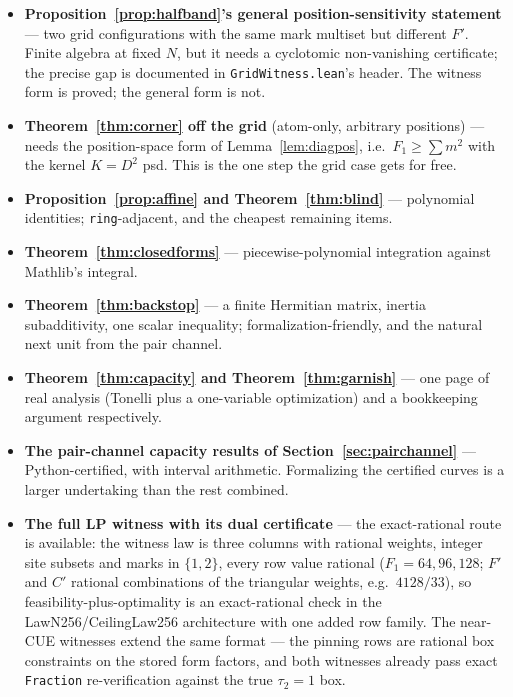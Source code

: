 \documentclass[11pt]{article}
\theoremstyle{plain}
\theoremstyle{definition}
\theoremstyle{remark}
\begin{document}
\begin{itemize}
\item \textbf{Proposition~\ref{prop:halfband}'s general position-sensitivity
  statement} --- two grid configurations with the same mark multiset but
  different $F'$. Finite algebra at fixed $N$, but it needs a cyclotomic
  non-vanishing certificate; the precise gap is documented in
  \texttt{GridWitness.lean}'s header. The witness form is proved; the general
  form is not.
\item \textbf{Theorem~\ref{thm:corner} off the grid} (atom-only, arbitrary
  positions) --- needs the position-space form of Lemma~\ref{lem:diagpos},
  i.e.\ $F_1 \ge \sum m^2$ with the kernel $K = D^2$ psd. This is the one step
  the grid case gets for free.
\item \textbf{Proposition~\ref{prop:affine} and Theorem~\ref{thm:blind}} ---
  polynomial identities; \texttt{ring}-adjacent, and the cheapest remaining
  items.
\item \textbf{Theorem~\ref{thm:closedforms}} --- piecewise-polynomial
  integration against Mathlib's integral.
\item \textbf{Theorem~\ref{thm:backstop}} --- a finite Hermitian matrix, inertia
  subadditivity, one scalar inequality; formalization-friendly, and the natural
  next unit from the pair channel.
\item \textbf{Theorem~\ref{thm:capacity} and Theorem~\ref{thm:garnish}} --- one
  page of real analysis (Tonelli plus a one-variable optimization) and a
  bookkeeping argument respectively.
\item \textbf{The pair-channel capacity results of
  Section~\ref{sec:pairchannel}} --- Python-certified, with interval arithmetic.
  Formalizing the certified curves is a larger undertaking than the rest
  combined.
\item \textbf{The full LP witness with its dual certificate} --- the
  exact-rational route is available: the witness law is three columns with
  rational weights, integer site subsets and marks in $\{1, 2\}$, every row value
  rational ($F_1 = 64, 96, 128$; $F'$ and $C'$ rational combinations of the
  triangular weights, e.g.\ $4128/33$), so feasibility-plus-optimality is an
  exact-rational check in the LawN256/CeilingLaw256 architecture with one added
  row family. The near-CUE witnesses extend the same format --- the pinning rows
  are rational box constraints on the stored form factors, and both witnesses
  already pass exact \texttt{Fraction} re-verification against the true
  $\tau_2 = 1$ box.
\end{itemize}
\end{document}
